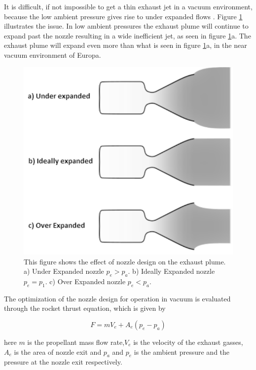 It is difficult, if not impossible to get a thin exhaust jet in a vacuum environment, because the low ambient pressure gives rise to under expanded flows \cite{spacecraft}. Figure \ref{jetflows} illustrates the issue. In low ambient pressures the exhaust plume will continue to expand past the nozzle resulting in a wide inefficient jet, as seen in figure \ref{jetflows}a. The exhaust plume will expand even more  than what is seen in figure \ref{jetflows}a, in the near vacuum environment of Europa. 

\begin{figure}
\begin{center}
\includegraphics[scale=0.8]{figures/navtheory/nozzle}
\caption{This figure shows the effect of nozzle design on the exhaust plume. a) Under Expanded nozzle $p_e>p_a$. b) Ideally Expanded nozzle $p_e=p_1$. c) Over Expanded nozzle $p_e<p_a$. }
\label{jetflows}
\end{center}
\end{figure}

The optimization of the nozzle design for operation in vacuum is evaluated through the rocket thrust equation, which is given by \cite{spacecraft}

\begin{equation}
F=mV_e+A_e(p_e-p_a)
\end{equation}

here $m$ is the propellant mass flow rate,$V_e$ is the velocity of the exhaust gasses, $A_e$ is the area of nozzle exit and $p_a$ and $p_e$ is the ambient pressure and the pressure at the nozzle exit respectively. 

